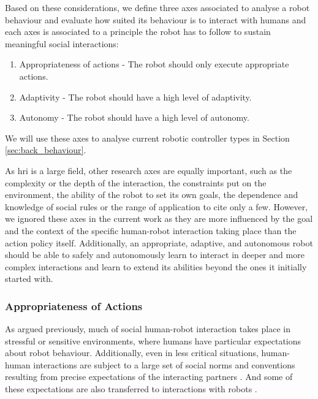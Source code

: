     Based on these considerations, we define three axes associated to analyse a robot behaviour and evaluate how suited its behaviour is to interact with humans and each axes is associated to a principle the robot has to follow to sustain meaningful social interactions:
    \begin{enumerate}
    	\item Appropriateness of actions - The robot should only execute appropriate actions.
    	\item Adaptivity - The robot should have a high level of adaptivity.
    	\item Autonomy - The robot should have a high level of autonomy.
    \end{enumerate}
    We will use these axes to analyse current robotic controller types in Section \ref{sec:back_behaviour}.    
    
    As \gls{hri} is a large field, other research axes are equally important, such as the complexity or the depth of the interaction, the constraints put on the environment, the ability of the robot to set its own goals, the dependence and knowledge of social rules or the range of application to cite only a few. However, we ignored these axes in the current work as they are more influenced by the goal and the context of the specific human-robot interaction taking place than the action policy itself. Additionally, an appropriate, adaptive, and autonomous robot should be able to safely and autonomously learn to interact in deeper and more complex interactions and learn to extend its abilities beyond the ones it initially started with.

\subsubsection{Appropriateness of Actions} \label{ssec:appropriateness} %
    As argued previously, much of social human-robot interaction takes place in  stressful or sensitive environments, where humans have particular expectations about robot behaviour. Additionally, even in less critical situations, human-human interactions are subject to a large set of social norms and conventions resulting from precise expectations of the interacting partners \citep{sherif1936psychology}. And some of these expectations are also transferred to interactions with robots \citep{bartneck2004design}.
    
